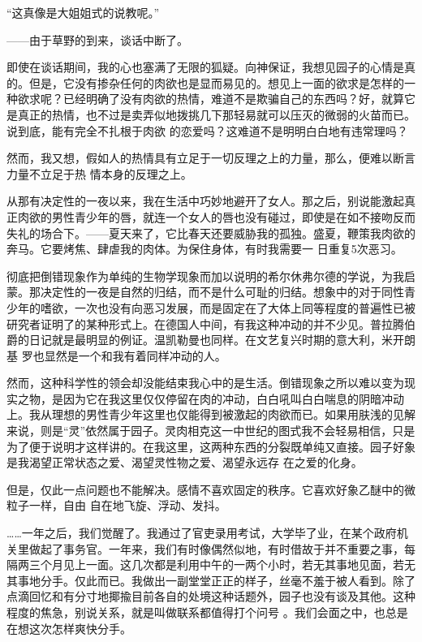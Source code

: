 \documentclass{article}
\begin{document}
“这真像是大姐姐式的说教呢。” 


——由于草野的到来，谈话中断了。 

\newpage

即使在谈话期间，我的心也塞满了无限的狐疑。向神保证，我想见园子的心情是真的。但是，它没有掺杂任何的肉欲也是显而易见的。想见上一面的欲求是怎样的一种欲求呢？已经明确了没有肉欲的热情，难道不是欺骗自己的东西吗？好，就算它是真正的热情，也不过是卖弄似地拨挑几下那轻易就可以压灭的微弱的火苗而已。说到底，能有完全不扎根于肉欲
的恋爱吗？这难道不是明明白白地有违常理吗？ 

然而，我又想，假如人的热情具有立足于一切反理之上的力量，那么，便难以断言力量不立足于热
情本身的反理之上。 

从那有决定性的一夜以来，我在生活中巧妙地避开了女人。那之后，别说能激起真正肉欲的男性青少年的唇，就连一个女人的唇也没有碰过，即使是在如不接吻反而失礼的场合下。——夏天来了，它比春天还要威胁我的孤独。盛夏，鞭策我肉欲的奔马。它要烤焦、肆虐我的肉体。为保住身体，有时我需要一
日重复5次恶习。 

\newpage

彻底把倒错现象作为单纯的生物学现象而加以说明的希尔休弗尔德的学说，为我启蒙。那决定性的一夜是自然的归结，而不是什么可耻的归结。想象中的对于同性青少年的嗜欲，一次也没有向恶习发展，而是固定在了大体上同等程度的普遍性已被研究者证明了的某种形式上。在德国人中间，有我这种冲动的并不少见。普拉腾伯爵的日记就是最明显的例证。温凯勒曼也同样。在文艺复兴时期的意大利，米开朗基
罗也显然是一个和我有着同样冲动的人。 

然而，这种科学性的领会却没能结束我心中的是生活。倒错现象之所以难以变为现实之物，是因为它在我这里仅仅停留在肉的冲动，白白吼叫白白喘息的阴暗冲动上。我从理想的男性青少年这里也仅能得到被激起的肉欲而已。如果用肤浅的见解来说，则是“灵”依然属于园子。灵肉相克这一中世纪的图式我不会轻易相信，只是为了便于说明才这样讲的。在我这里，这两种东西的分裂既单纯又直接。园子好象是我渴望正常状态之爱、渴望灵性物之爱、渴望永远存
在之爱的化身。 

\newpage

但是，仅此一点问题也不能解决。感情不喜欢固定的秩序。它喜欢好象乙醚中的微粒子一样，自由
自在地飞旋、浮动、发抖。 

……一年之后，我们觉醒了。我通过了官吏录用考试，大学毕了业，在某个政府机关里做起了事务官。一年来，我们有时像偶然似地，有时借故于并不重要之事，每隔两三个月见上一面。这几次都是利用中午的一两个小时，若无其事地见面，若无其事地分手。仅此而已。我做出一副堂堂正正的样子，丝毫不羞于被人看到。除了点滴回忆和有分寸地揶揄目前各自的处境这种话题外，园子也没有谈及其他。这种程度的焦急，别说关系，就是叫做联系都值得打个问号
。我们会面之中，也总是在想这次怎样爽快分手。 
\end{document}
